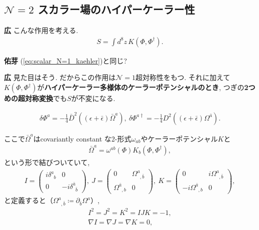 \documentclass{ltjsarticle}
\theoremstyle{definition}
\newcommand{\parno}{\par\noindent}
\begin{document}
\subsection{$\mathcal N=2$ スカラー場のハイパーケーラー性\label{subsection:N=2_nonlinear_sigma_model}}
\noindent
\textbf{広} こんな作用を考える.
\begin{align}
  S=\int d^8z\,K(\Phi,\Phi^\dagger).\label{eq:N=2_hyper-Kaehler_action}
\end{align}
\parno
\textbf{佑芽} (\ref{eq:scalar_N=1_kaehler})と同じ?\parno
\textbf{広} 見た目はそう. だからこの作用は$\mathcal N=1$超対称性をもつ. それに加えて$K(\Phi,\Phi^\dagger)$が\textbf{ハイパーケーラー多様体のケーラーポテンシャルのとき}, つぎの\textbf{2つめの超対称変換}でも$S$が不変になる.
\begin{tcolorbox}
\begin{align}
  \delta \Phi^a=-\frac14\bar D^2\left(\left(\epsilon+\bar\epsilon\right)\bar\Omega^a\right),\ \delta \Phi^{a\dagger}=-\frac14 D^2\left(\left(\epsilon+\bar\epsilon\right)\Omega^{\bar a}\right).\label{eq:2nd_susy_N=2_chiral_scalar}
\end{align}
\end{tcolorbox}
\parno
ここで$\bar\Omega^a$はcovariantly constant な2-形式$\omega_{ab}$やケーラーポテンシャル$K$と
\begin{align}
  \bar\Omega^a=\omega^{ab}(\Phi)K_b(\Phi,\Phi^\dagger),
\end{align}
という形で結びついていて,
\begin{align}
  I=
  \begin{pmatrix}
    i\delta^a_{\phantom{a}b}&0\\
    0&-i\delta^{\bar a}_{\phantom{\bar a}\bar b}
  \end{pmatrix}
  ,\ J=
  \begin{pmatrix}
    0&\Omega^a_{\phantom{a},\bar b}\\
    \Omega^{\bar a}_{\phantom{\bar a},b}&0
  \end{pmatrix}
  ,\ K=
  \begin{pmatrix}
    0&i\Omega^a_{\phantom{a},\bar b}\\
    -i\Omega^{\bar a}_{\phantom{\bar a},b}&0
  \end{pmatrix},
\end{align}
と定義すると（$\Omega^a_{\phantom{a},\bar b}\coloneqq \partial_{\bar b}\Omega^a$）,
\begin{gather}
  I^2=J^2=K^2=IJK=-1,\\
  \nabla I=\nabla J=\nabla K=0,
\end{gather}
\end{document}
